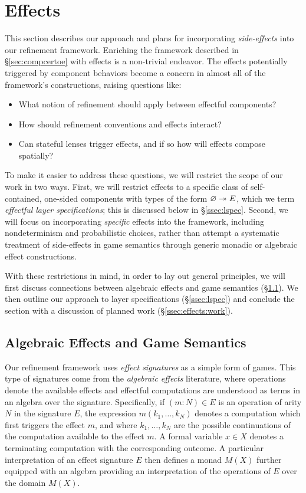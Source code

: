 \newpage
\section{Effects}
\label{sec:effects}

This section describes our approach and plans for
incorporating \emph{side-effects} into our refinement framework.
Enriching the framework described in \S\ref{sec:compcertoe} with effects
is a non-trivial endeavor.
The effects potentially triggered by component behaviors
become a concern in almost all of the framework's constructions,
raising questions like:
\begin{itemize}
  \item What notion of refinement should apply
    between effectful components?
  \item How should refinement conventions and effects interact?
  \item Can stateful lenses trigger effects,
    and if so how will effects compose spatially?
\end{itemize}
To make it easier to address these questions,
we will restrict the scope of our work in two ways.
First, we will restrict effects to a specific class of
self-contained, one-sided components
with types of the form $\varnothing \twoheadrightarrow E$,
which we term \emph{effectful layer specifications};
this is discussed below in \S\ref{ssec:lspec}.
Second,
we will focus on incorporating \emph{specific} effects
into the framework,
including nondeterminism and probabilistic choices,
rather than attempt a systematic treatment of
side-effects in game semantics
through generic monadic or algebraic effect constructions.

With these restrictions in mind,
in order to lay out general principles,
we will first discuss connections between
algebraic effects and game semantics (\S\ref{ssec:ags}).
We then outline our approach to layer specifications (\S\ref{ssec:lspec})
and conclude the section with a discussion of
planned work (\S\ref{ssec:effects:work}).

\subsection{Algebraic Effects and Game Semantics} \label{ssec:ags}

Our refinement framework uses \emph{effect signatures}
as a simple form of games.
This type of signatures come from
the \emph{algebraic effects} literature,
where operations denote the available effects
and effectful computations are understood as
terms in an algebra over the signature.
Specifically,
if $(m \mathbin: N) \in E$
is an operation of arity $N$ in the signature $E$,
the expression $m(k_1, \ldots, k_N)$
denotes a computation which first triggers the effect $m$,
and where $k_1, \ldots, k_N$ are
the possible continuations of the computation
available to the effect $m$.
A formal variable $x \in X$ denotes
a terminating computation with the corresponding outcome.
A particular interpretation of an effect signature $E$
then defines a monad $M(X)$
further equipped with an algebra
providing an interpretation of the operations of $E$
over the domain $M(X)$.

